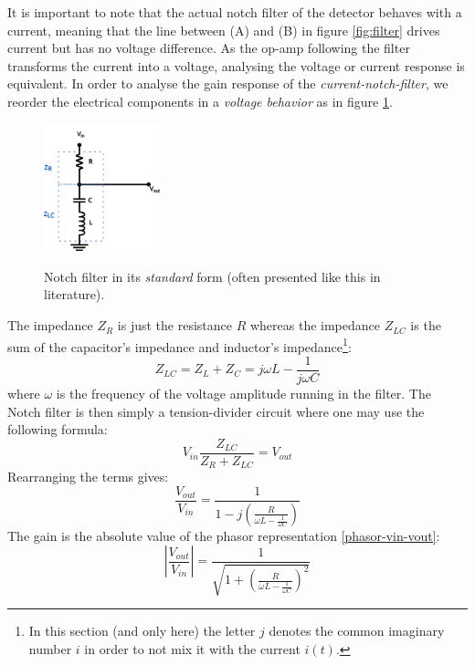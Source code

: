 \documentclass[11pt]{report}
\begin{document}
It is important to note that the actual notch filter of the detector behaves with a current, meaning that the line between (A) and (B) in figure \ref{fig:filter} drives current but has no voltage difference. As the op-amp following the filter transforms the current into a voltage, analysing the voltage or current response is equivalent. In order to analyse the gain response of the \textit{current-notch-filter}, we reorder the electrical components in a \textit{voltage behavior} as in figure \ref{fig:notch-tension}.
\begin{figure}[h!]
\caption{Notch filter in its \textit{standard} form (often presented like this in literature).}
\centering
\includegraphics[width=0.3\textwidth]{notch-tension}
\label{fig:notch-tension}
\end{figure}
The impedance $Z_R$ is just the resistance $R$ whereas the impedance $Z_{LC}$ is the sum of the capacitor's impedance and inductor's impedance\footnote{In this section (and only here) the letter $j$ denotes the common imaginary number $i$ in order to not mix it with the current $i(t)$.}:
\begin{equation}
Z_{LC} = Z_{L} + Z_{C} = j\omega L - \frac{1}{j\omega C}
\end{equation}
where $\omega$ is the frequency of the voltage amplitude running in the filter. The Notch filter is then simply a tension-divider circuit where one may use the following formula:
\begin{equation}
V_{in}\frac{Z_{LC}}{Z_{R} + Z_{LC}} = V_{out}
\end{equation}
Rearranging the terms gives:
\begin{equation}
\frac{V_{out}}{V_{in}} = \frac{1}{1 - j\left( \frac{R}{\omega L - \frac{1}{\omega C}} \right)}
\label{phasor-vin-vout}
\end{equation}
The gain is the absolute value of the phasor representation \ref{phasor-vin-vout}:
\begin{equation}
\left\vert \frac{V_{out}}{V_{in}} \right\vert = \frac{1}{\sqrt{1 + \left( \frac{R}{\omega L - \frac{1}{\omega C}} \right)^2}}
\end{equation}
\end{document}
